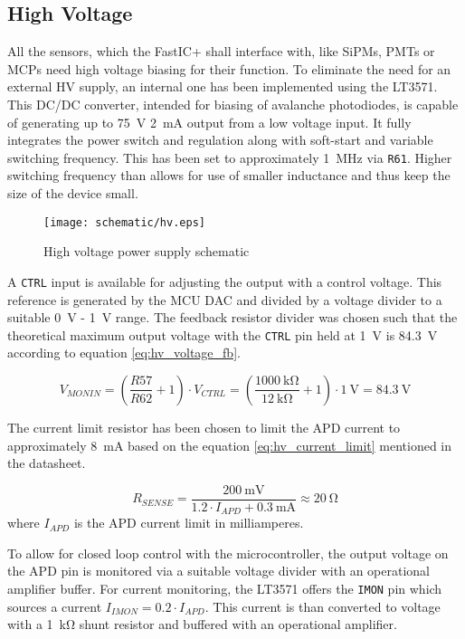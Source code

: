 \subsection{High Voltage}
All the sensors, which the FastIC+ shall interface with, like SiPMs, PMTs or MCPs need high voltage biasing for their function. To eliminate the need for an external HV supply, an internal one has been implemented using the LT3571. This DC/DC converter, intended for biasing of avalanche photodiodes, is capable of generating up to \SI{75}{\volt} \SI{2}{\milli\ampere} output from a low voltage input. It fully integrates the power switch and regulation along with soft-start and variable switching frequency. This has been set to approximately \SI{1}{\mega\hertz} via \verb|R61|. Higher switching frequency than allows for use of smaller inductance and thus keep the size of the device small. 

\FloatBarrier
\begin{figure}[htp!]
    \centering
    \texttt{[image: schematic/hv.eps]}
    \caption{High voltage power supply schematic}
    \label{fig:schem_hv}
\end{figure}
\FloatBarrier

A \verb|CTRL| input is available for adjusting the output with a control voltage. This reference is generated by the MCU DAC and divided by a voltage divider to a suitable \SI{0}{V} -  \SI{1}{V} range. The feedback resistor divider was chosen such that the theoretical maximum output voltage with the \verb|CTRL| pin held at \SI{1}{\volt} is \SI{84.3}{\volt} according to equation \ref{eq:hv_voltage_fb}.

\begin{equation}
V_{MONIN} = (\frac{R57}{R62} + 1) \cdot V_{CTRL} = (\frac{\SI{1000}{\kilo\ohm}}{\SI{12}{\kilo\ohm}} + 1) \cdot \SI{1}{\volt} = \SI{84.3}{\volt}
\label{eq:hv_voltage_fb}
\end{equation}


The current limit resistor has been chosen to limit the APD current to approximately \SI{8}{\milli\ampere} based on the equation \ref{eq:hv_current_limit} mentioned in the datasheet.

\begin{equation}
R_{SENSE} = \frac{\SI{200}{\milli\volt}}{1.2 \cdot I_{APD} + \SI{0.3}{\milli\ampere}} \approx \SI{20}{\ohm}
\label{eq:hv_current_limit}
\end{equation}
%
where $I_{APD}$ is the APD current limit in milliamperes.

To allow for closed loop control with the microcontroller, the output voltage on the APD pin is monitored via a suitable voltage divider with an operational amplifier buffer. For current monitoring, the LT3571 offers the \verb|IMON| pin which sources a current $I_{IMON} = 0.2 \cdot I_{APD}$. This current is than converted to voltage with a \SI{1}{\kilo\ohm} shunt resistor and buffered with an operational amplifier.

